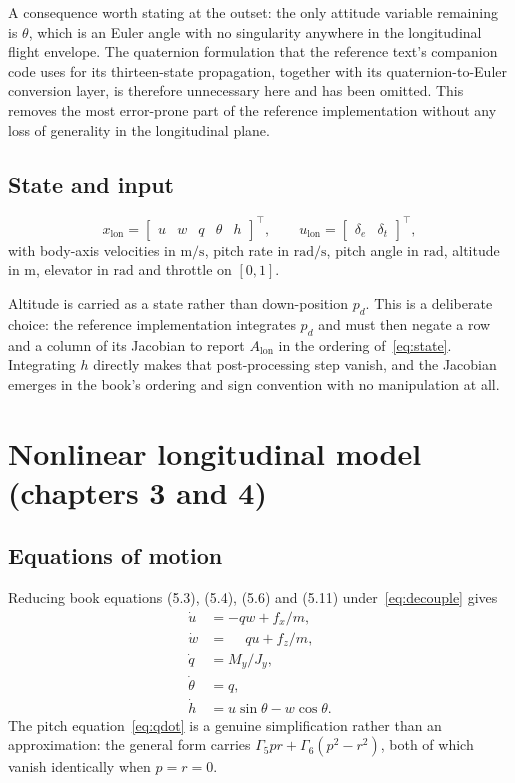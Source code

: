 \documentclass[11pt,a4paper]{article}
\newcommand{\lon}{\mathrm{lon}}
\newcommand{\dt}{\delta_t}
\newcommand{\de}{\delta_e}
\begin{document}
A consequence worth stating at the outset: the only attitude variable remaining is
$\theta$, which is an Euler angle with no singularity anywhere in the
longitudinal flight envelope. The quaternion formulation that the reference text's
companion code uses for its thirteen-state propagation, together with its
quaternion-to-Euler conversion layer, is therefore unnecessary here and has been
omitted. This removes the most error-prone part of the reference implementation
without any loss of generality in the longitudinal plane.

\subsection{State and input}

\begin{equation}
  x_\lon = \begin{bmatrix} u & w & q & \theta & h \end{bmatrix}^{\!\top},
  \qquad
  u_\lon = \begin{bmatrix} \de & \dt \end{bmatrix}^{\!\top},
  \label{eq:state}
\end{equation}
with body-axis velocities in $\mathrm{m/s}$, pitch rate in $\mathrm{rad/s}$,
pitch angle in $\mathrm{rad}$, altitude in $\mathrm{m}$, elevator in
$\mathrm{rad}$ and throttle on $[0,1]$.

Altitude is carried as a state rather than down-position $p_d$. This is a
deliberate choice: the reference implementation integrates $p_d$ and must then
negate a row and a column of its Jacobian to report $A_\lon$ in the ordering
of~\eqref{eq:state}. Integrating $h$ directly makes that post-processing step
vanish, and the Jacobian emerges in the book's ordering and sign convention with
no manipulation at all.

\section{Nonlinear longitudinal model (chapters 3 and 4)}

\subsection{Equations of motion}

Reducing book equations (5.3), (5.4), (5.6) and (5.11)
under~\eqref{eq:decouple} gives
\begin{align}
  \dot u      &= -qw + f_x/m, \label{eq:udot}\\
  \dot w      &= \phantom{-}qu + f_z/m, \label{eq:wdot}\\
  \dot q      &= M_y/J_y, \label{eq:qdot}\\
  \dot\theta  &= q, \label{eq:thetadot}\\
  \dot h      &= u\sin\theta - w\cos\theta. \label{eq:hdot}
\end{align}
The pitch equation~\eqref{eq:qdot} is a genuine simplification rather than an
approximation: the general form carries $\Gamma_5 pr + \Gamma_6(p^2-r^2)$, both of
which vanish identically when $p=r=0$.
\end{document}
